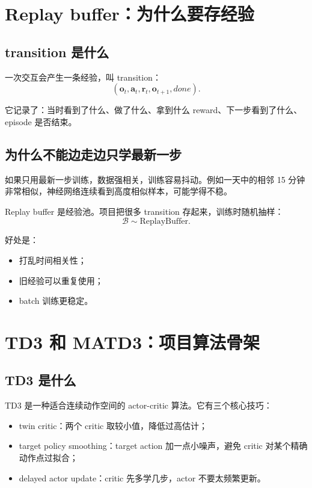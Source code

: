 \documentclass[UTF8,zihao=-4]{ctexart}
\begin{document}
\section{Replay buffer：为什么要存经验}

\subsection{transition 是什么}

一次交互会产生一条经验，叫 transition：
\begin{equation}
(\bm{o}_t,\bm{a}_t,\bm{r}_t,\bm{o}_{t+1},done).
\end{equation}

它记录了：当时看到了什么、做了什么、拿到什么 reward、下一步看到了什么、episode 是否结束。

\subsection{为什么不能边走边只学最新一步}

如果只用最新一步训练，数据强相关，训练容易抖动。例如一天中的相邻 15 分钟非常相似，神经网络连续看到高度相似样本，可能学得不稳。

Replay buffer 是经验池。项目把很多 transition 存起来，训练时随机抽样：
\begin{equation}
\mathcal{B}\sim \text{ReplayBuffer}.
\end{equation}

好处是：
\begin{itemize}
  \item 打乱时间相关性；
  \item 旧经验可以重复使用；
  \item batch 训练更稳定。
\end{itemize}

\section{TD3 和 MATD3：项目算法骨架}

\subsection{TD3 是什么}

TD3 是一种适合连续动作空间的 actor-critic 算法。它有三个核心技巧：
\begin{itemize}
  \item twin critic：两个 critic 取较小值，降低过高估计；
  \item target policy smoothing：target action 加一点小噪声，避免 critic 对某个精确动作点过拟合；
  \item delayed actor update：critic 先多学几步，actor 不要太频繁更新。
\end{itemize}
\end{document}
